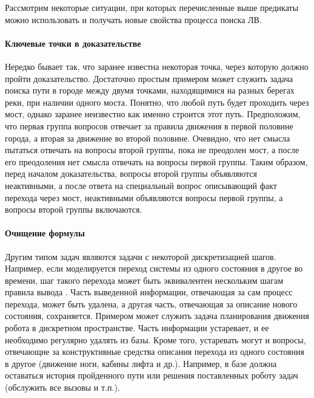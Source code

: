 Рассмотрим некоторые ситуации, при которых перечисленные выше предикаты можно использовать и получать новые свойства процесса поиска ЛВ.

\paragraph{Ключевые точки в доказательстве} Нередко бывает так, что заранее известна некоторая точка, через которую должно пройти доказательство. Достаточно простым примером может служить задача поиска пути в городе между двумя точками, находящимися на разных берегах реки, при наличии одного моста. Понятно, что любой путь будет проходить через мост, однако заранее неизвестно как именно строится этот путь. Предположим, что первая группа вопросов отвечает за правила движения в первой половине города, а вторая за движение во второй половине. Очевидно, что нет смысла пытаться отвечать на вопросы второй группы, пока не преодолен мост, а после его преодоления нет смысла отвечать на вопросы первой группы. Таким образом, перед началом доказательства, вопросы второй группы объявляются неактивными, а после ответа на специальный вопрос описывающий факт перехода через мост, неактивными объявляются вопросы первой группы, а вопросы второй группы включаются.

\paragraph{Очищение формулы} Другим типом задач являются задачи с некоторой дискретизацией шагов. Например, если моделируется переход системы из одного состояния в другое во времени, шаг такого перехода может быть эквивалентен нескольким шагам правила вывода . Часть выведенной информации, отвечающая за сам процесс перехода, может быть удалена, а другая часть, отвечающая за описание нового состояния, сохраняется. Примером может служить задача планирования движения робота в дискретном пространстве. Часть информации устаревает, и ее необходимо регулярно удалять из базы. Кроме того, устаревать могут и вопросы, отвечающие за конструктивные средства описания перехода из одного состояния в другое (движение ноги, кабины лифта и др.). Например, в базе должна оставаться история пройденного пути или решения поставленных роботу задач (обслужить все вызовы и т.п.).

